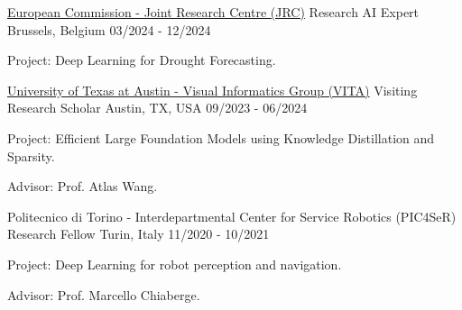 

\begin{cventries}

    \cventry
    {\href{https://commission.europa.eu/}{European Commission - Joint Research Centre (JRC)}} %
    {Research AI Expert} %
    {Brussels, Belgium} %
    {03/2024 - 12/2024} %
    {
      \begin{cvitems} %
        \item {Project: Deep Learning for Drought Forecasting.}
      \end{cvitems}
    }  
    
    \cventry
    {\href{https://vita-group.github.io}{University of Texas at Austin - Visual Informatics Group (VITA)}} %
    {Visiting Research Scholar} %
    {Austin, TX, USA} %
    {09/2023 - 06/2024} %
    {
      \begin{cvitems} %
        \item {Project: Efficient Large Foundation Models using Knowledge Distillation and Sparsity.}
        \item {Advisor: Prof. Atlas Wang.}
      \end{cvitems}
    }  
    
    \cventry
    {Politecnico di Torino - Interdepartmental Center for Service Robotics (PIC4SeR)} %
    {Research Fellow} %
    {Turin, Italy} %
    {11/2020 - 10/2021} %
    {
      \begin{cvitems} %
        \item {Project: Deep Learning for robot perception and navigation.}
        \item {Advisor: Prof. Marcello Chiaberge.}
      \end{cvitems}
    }
\end{cventries}
